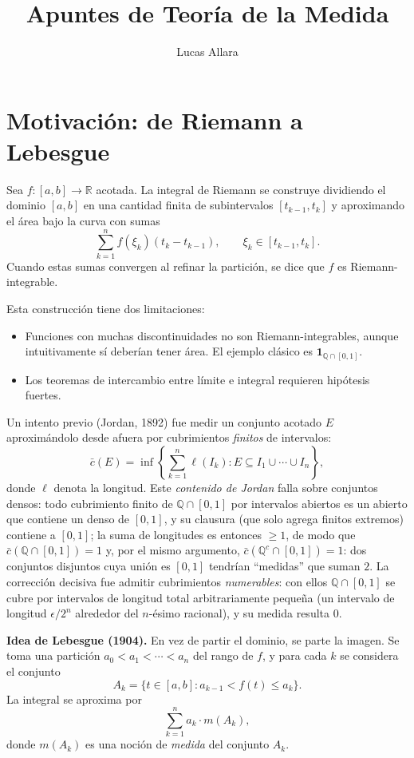 \documentclass[11pt, a4paper]{article}
\title{
    \vspace{-2cm}
    \textbf{\Huge Apuntes de Teoría de la Medida}\\
    \vspace{0.5cm}
}
\author{Lucas Allara}
\date{}
\begin{document}
\maketitle
\newpage

\tableofcontents
\newpage

\section{Motivación: de Riemann a Lebesgue}

Sea $f: [a, b] \to \mathbb{R}$ acotada. La integral de Riemann se construye dividiendo el dominio
$[a, b]$ en una cantidad finita de subintervalos $[t_{k-1}, t_k]$ y aproximando el área bajo la
curva
con sumas
$$ \sum_{k=1}^n f(\xi_k) (t_k - t_{k-1}), \qquad \xi_k \in [t_{k-1}, t_k]. $$
Cuando estas sumas convergen al refinar la partición, se dice que $f$ es Riemann-integrable.

Esta construcción tiene dos limitaciones:
\begin{itemize}
    \item Funciones con muchas discontinuidades no son Riemann-integrables, aunque
    intuitivamente sí deberían tener área. El ejemplo clásico es
    $\mathbf{1}_{\mathbb{Q} \cap [0,1]}$.
    \item Los teoremas de intercambio entre límite e integral requieren hipótesis fuertes.
\end{itemize}

Un intento previo (Jordan, 1892) fue medir un conjunto acotado $E$ aproximándolo desde afuera
por cubrimientos \emph{finitos} de intervalos:
$$ \bar c(E) = \inf\left\{ \sum_{k=1}^n \ell(I_k) : E \subseteq I_1 \cup \cdots \cup I_n \right\}, $$
donde $\ell$ denota la longitud. Este \emph{contenido de Jordan} falla sobre conjuntos densos:
todo cubrimiento finito de $\mathbb{Q} \cap [0,1]$ por intervalos abiertos es un abierto que
contiene un denso de $[0,1]$, y su clausura (que solo agrega finitos extremos) contiene a
$[0,1]$; la suma de longitudes es entonces $\ge 1$, de modo que
$\bar c(\mathbb{Q} \cap [0,1]) = 1$ y, por el mismo argumento,
$\bar c(\mathbb{Q}^c \cap [0,1]) = 1$: dos conjuntos disjuntos cuya unión es $[0,1]$ tendrían
``medidas'' que suman $2$. La corrección decisiva fue admitir cubrimientos \emph{numerables}:
con ellos $\mathbb{Q} \cap [0,1]$ se cubre por intervalos de longitud total arbitrariamente
pequeña (un intervalo de longitud $\epsilon/2^n$ alrededor del $n$-ésimo racional), y su medida
resulta $0$.

\textbf{Idea de Lebesgue (1904).} En vez de partir el dominio, se parte la imagen. Se toma una
partición $a_0 < a_1 < \cdots < a_n$ del rango de $f$, y para cada $k$ se considera el conjunto
$$ A_k = \{ t \in [a, b] : a_{k-1} < f(t) \le a_k \}. $$
La integral se aproxima por
$$ \sum_{k=1}^n a_k \cdot m(A_k), $$
donde $m(A_k)$ es una noción de \emph{medida} del conjunto $A_k$.
\end{document}
